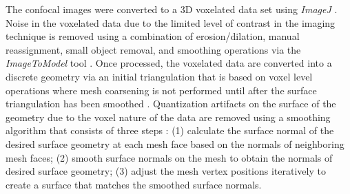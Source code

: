 \documentclass[]{interact}
\begin{document}
The confocal images were converted to a 3D voxelated data set using \textit{ImageJ} \citep{Schneider:2012dw}. Noise in the voxelated data due to the limited level of contrast in the imaging technique is removed using a combination of erosion/dilation, manual reassignment, small object removal, and smoothing operations via the \textit{ImageToModel} tool \citep{Klaas:2013ug, Klaas_conference, simmetrix}. Once processed, the voxelated data are converted into a discrete geometry via an initial triangulation that is based on voxel level operations where mesh coarsening is not performed until after the surface triangulation has been smoothed \citep{Klaas:2013ug}. Quantization artifacts on the surface of the geometry due to the voxel nature of the data are removed using a smoothing algorithm that consists of three steps \citep{Klaas:2013ug}: (1) calculate the surface normal of the desired surface geometry at each mesh face based on the normals of neighboring mesh faces; (2) smooth surface normals on the mesh to obtain the normals of desired surface geometry; (3) adjust the mesh vertex positions iteratively to create a surface that matches the smoothed surface normals.
\end{document}
